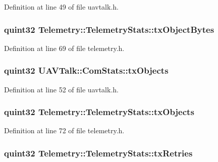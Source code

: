 \-Definition at line 49 of file uavtalk.\-h.

\hypertarget{group___u_a_v_talk_plugin_ga5c315107de95913671e9bd51ce699e1f}{
\subsubsection[{tx\-Object\-Bytes}]{\setlength{\rightskip}{0pt plus 5cm}quint32 {\bf \-Telemetry\-::\-Telemetry\-Stats\-::tx\-Object\-Bytes}}}\label{group___u_a_v_talk_plugin_ga5c315107de95913671e9bd51ce699e1f}


\-Definition at line 69 of file telemetry.\-h.

\hypertarget{group___u_a_v_talk_plugin_ga4d48878de025a87f65263e537467fb9b}{
\subsubsection[{tx\-Objects}]{\setlength{\rightskip}{0pt plus 5cm}quint32 {\bf \-U\-A\-V\-Talk\-::\-Com\-Stats\-::tx\-Objects}}}\label{group___u_a_v_talk_plugin_ga4d48878de025a87f65263e537467fb9b}


\-Definition at line 52 of file uavtalk.\-h.

\hypertarget{group___u_a_v_talk_plugin_gaa7970a8185efea335e5cbe734739eca9}{
\subsubsection[{tx\-Objects}]{\setlength{\rightskip}{0pt plus 5cm}quint32 {\bf \-Telemetry\-::\-Telemetry\-Stats\-::tx\-Objects}}}\label{group___u_a_v_talk_plugin_gaa7970a8185efea335e5cbe734739eca9}


\-Definition at line 72 of file telemetry.\-h.

\hypertarget{group___u_a_v_talk_plugin_ga071780b1d6a06aa36a41efaa190e97ec}{
\subsubsection[{tx\-Retries}]{\setlength{\rightskip}{0pt plus 5cm}quint32 {\bf \-Telemetry\-::\-Telemetry\-Stats\-::tx\-Retries}}}\label{group___u_a_v_talk_plugin_ga071780b1d6a06aa36a41efaa190e97ec}


